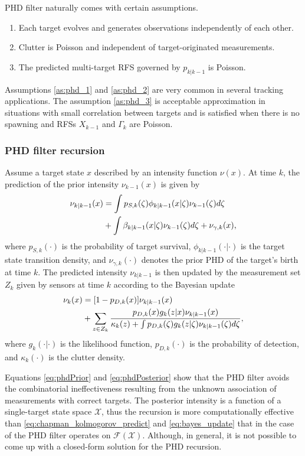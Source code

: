 PHD filter naturally comes with certain assumptions.
\begin{enumerate}
    \item Each target evolves and generates observations independently of each other. \label{as:phd_1}
    \item Clutter is Poisson and independent of target-originated measurements. \label{as:phd_2}
    \item The predicted multi-target RFS governed by $p_{k|k-1}$ is Poisson. \label{as:phd_3}
\end{enumerate}

Assumptions \ref{as:phd_1} and \ref{as:phd_2} are very common in several tracking applications. The assumption \ref{as:phd_3} is acceptable approximation in situations with small correlation between targets and is satisfied when
there is no spawning and RFSs $X_{k-1}$ and $\Gamma_k$ are Poisson.

            \subsubsection{PHD filter recursion}
Assume a target state $x$ described by an intensity function $\nu(x)$. At time $k$, the prediction of the prior intensity $\nu_{k-1}(x)$ is given by
\begin{align}
    \nu_{k|k-1}(x) &= \int p_{S,k}(\zeta)\phi_{k|k-1}(x|\zeta)\nu_{k-1}(\zeta)d\zeta \notag \\
        &+ \int \beta_{k|k-1}(x|\zeta) \nu_{k-1}(\zeta)d\zeta + \nu_{\gamma,k}(x),
    \label{eq:phdPrior}
\end{align}
where $p_{S,k}(\cdot)$ is the probability of target survival, $\phi_{k|k-1}(\cdot|\cdot)$ is the target state
transition density, and $\nu_{\gamma,k}(\cdot)$ denotes the prior PHD of the target's birth at time $k$.
The predicted intensity $\nu_{k|k-1}$ is then updated by the measurement set $Z_k$ given by sensors at time $k$ according to the Bayesian update
\begin{align}
        \nu_k(x) &= [1 - p_{D,k}(x)]\nu_{k|k-1}(x) \notag \\
        &+ \sum_{z \in Z_k}\frac{p_{D,k}(x) g_k(z|x) \nu_{k|k-1}(x)}{\kappa_k(z) + \int p_{D,k}(\zeta) g_k(z|\zeta) \nu_{k|k-1}(\zeta)d\zeta}, \label{eq:phdPosterior}
\end{align}
where $g_k(\cdot|\cdot)$ is the likelihood function, $p_{D,k}(\cdot)$ is the probability of detection, and $\kappa_k(\cdot)$ is the clutter density.

Equations \eqref{eq:phdPrior} and \eqref{eq:phdPosterior} show that the PHD filter avoids the combinatorial
ineffectiveness resulting from the unknown association of measurements with correct targets. The posterior intensity is
a function of a single-target state space $\mathcal{X}$, thus the recursion is more computationally effective than \eqref{eq:chapman_kolmogorov_predict} and \eqref{eq:bayes_update} that in the case of the PHD filter operates on $\mathcal{F(X)}$. Although, in general, it is not possible to come up with a closed-form solution for the PHD recursion.

